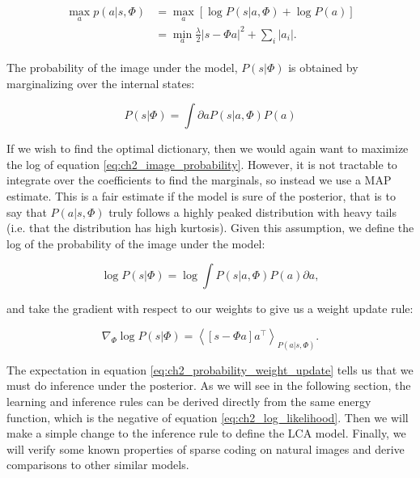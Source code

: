 \begin{align}\label{eq:ch2_min_log_likelihood}
\begin{split}
    \max_{a} p(a|s,\Phi) &= \max_{a}\left[\log{P(s|a,\Phi)} + \log{P(a)}\right] \\
                         &= \min_{a}\frac{\lambda}{2}|s - \Phi a|^{2} + \sum_{i}|a_{i}|.
\end{split}
\end{align}

The probability of the image under the model, $P(s|\Phi)$ is obtained by marginalizing over the internal states:

\begin{equation}\label{eq:ch2_image_probability}
    P(s|\Phi) = \int\partial a P(s|a,\Phi) P(a)
\end{equation}

If we wish to find the optimal dictionary, then we would again want to maximize the log of equation \ref{eq:ch2_image_probability}. However, it is not tractable to integrate over the coefficients to find the marginals, so instead we use a MAP estimate. This is a fair estimate if the model is sure of the posterior, that is to say that $P(a|s,\Phi)$ truly follows a highly peaked distribution with heavy tails (i.e. that the distribution has high kurtosis). Given this assumption, we define the log of the probability of the image under the model:

\begin{equation}\label{eq:ch2_log_image_probability}
    \log{P(s|\Phi)} = \log{\int P(s|a,\Phi)P(a)\partial a},
\end{equation}

\noindent and take the gradient with respect to our weights to give us a weight update rule:

\begin{equation}\label{eq:ch2_probability_weight_update}
    \nabla_{\Phi} \log{P(s|\Phi)} = \left< \left[s - \Phi a\right]a^{\top}\right>_{P(a|s,\Phi)}.
\end{equation}

The expectation in equation \ref{eq:ch2_probability_weight_update} tells us that we must do inference under the posterior. As we will see in the following section, the learning and inference rules can be derived directly from the same energy function, which is the negative of equation \ref{eq:ch2_log_likelihood}. Then we will make a simple change to the inference rule to define the LCA model. Finally, we will verify some known properties of sparse coding on natural images and derive comparisons to other similar models.


